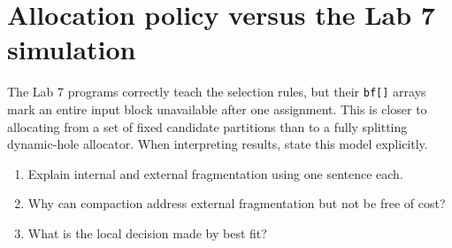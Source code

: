 \section{Allocation policy versus the Lab 7 simulation}
The Lab 7 programs correctly teach the selection rules, but their \texttt{bf[]} arrays mark an entire input block unavailable after one assignment. This is closer to allocating from a set of fixed candidate partitions than to a fully splitting dynamic-hole allocator. When interpreting results, state this model explicitly.

\begin{quickcheck}
\begin{enumerate}
  \item Explain internal and external fragmentation using one sentence each.
  \item Why can compaction address external fragmentation but not be free of cost?
  \item What is the local decision made by best fit?
\end{enumerate}
\end{quickcheck}
